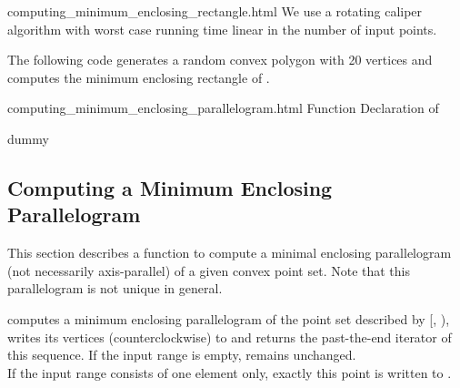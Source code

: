 \begin{ccHtmlClassFile}{computing_minimum_enclosing_rectangle.html}
  \ccImplementation We use a rotating caliper algorithm
  \cite{t-sgprc-83} with worst case running time linear in the number
  of input points.
  
  \ccExample The following code generates a random convex polygon
   with 20 vertices and computes the minimum enclosing
  rectangle of .


\end{ccHtmlClassFile}
    
\ccHtmlNoClassToc
\begin{ccHtmlClassFile}{computing_minimum_enclosing_parallelogram.html}
  {Function Declaration of }
  \ccHtmlNoClassIndex\ccHtmlNoClassLinks
  \begin{ccClass}{dummy}
    \ccHtmlNoIndex\subsection{Computing a Minimum Enclosing Parallelogram}
  \label{secMinimumEnclosingParallelogramm}
  \end{ccClass}
  
  This section describes a function to compute a minimal enclosing
  parallelogram (not necessarily axis-parallel) of a given convex
  point set. Note that this parallelogram is not unique in general.


  \def\ccLongParamLayout{\ccTrue} 
  
  
  computes a minimum enclosing parallelogram of the point set
  described by [, ), writes its
  vertices (counterclockwise) to  and returns the past-the-end
  iterator of this sequence.
  If the input range is empty,  remains unchanged.\\
  If the input range consists of one element only,
  exactly this point is written to .\\
  

\end{ccHtmlClassFile}
